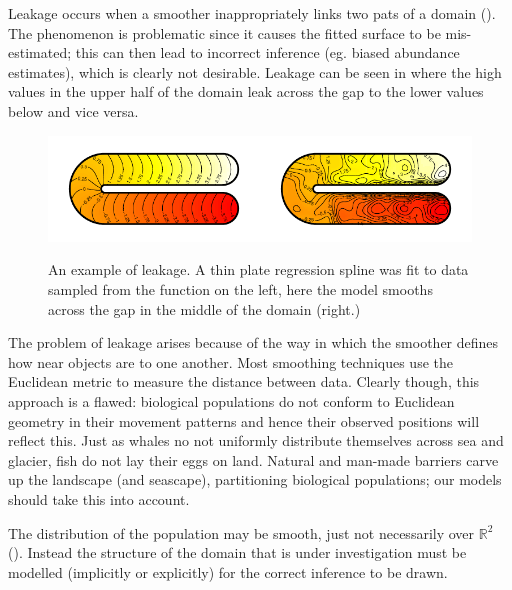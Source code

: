 Leakage occurs when a smoother inappropriately links two pats of a domain (\cite{soap}). The phenomenon is problematic since it causes the fitted surface to be mis-estimated; this can then lead to incorrect inference (eg. biased abundance estimates), which is clearly not desirable. Leakage can be seen in  where the high values in the upper half of the domain leak across the gap to the lower values below and vice versa.

\begin{figure}
\centering
\includegraphics{intro/figs/ramsay-leak.pdf}\\
\caption{An example of leakage. A thin plate regression spline was fit to data sampled from the function on the left, here the model smooths across the gap in the middle of the domain (right.)}
\label{leakage}
\end{figure}

The problem of leakage arises because of the way in which the smoother defines how near objects are to one another. Most smoothing techniques use the Euclidean metric to measure the distance between data. Clearly though, this approach is a flawed: biological populations do not conform to Euclidean geometry in their movement patterns and hence their observed positions will reflect this. Just as whales no not uniformly distribute themselves across sea and glacier, fish do not lay their eggs on land. Natural and man-made barriers carve up the landscape (and seascape), partitioning biological populations; our models should take this into account.

The distribution of the population may be smooth, just not necessarily over $\mathbb{R}^2$ (\cite{wangranalli}). Instead the structure of the domain that is under investigation must be modelled (implicitly or explicitly) for the correct inference to be drawn.

